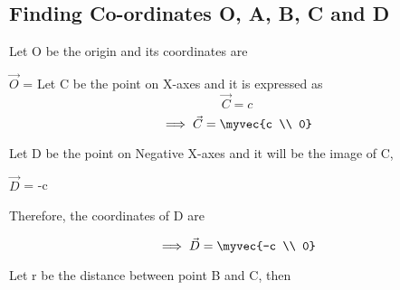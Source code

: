 \documentclass[journal,10pt,twocolumn]{article}
\begin{document}
\subsection{Finding Co-ordinates O, A, B, C and D}
\begin{flushleft}
Let O be the origin and its coordinates are\\
\vspace{0.25cm}

\center
\vspace{0.4cm}
$\vec{O}$ = 
\endcenter{}
\vspace{0.25cm}
Let C be the point on X-axes and it is expressed as\\
\vspace{0.25cm}
\begin{equation}
    \vec{C} = c
    \end{equation}
\begin{equation}
\implies \vec{C}= \myvec{c \\ 0}
\end{equation}

\vspace{0.25cm}
\begin{flushleft}
Let D be the point on Negative X-axes and it will be the image of C,\\
\begin{center}
$\vec{D}$  = -c\\
\end{center}
\vspace{0.2cm}
Therefore, the coordinates of D are\\
\end{flushleft}

\begin{equation}
\implies \vec{D}= \myvec{-c \\ 0}
\end{equation}

\vspace{0.25cm}
\begin{flushleft}
Let r be the distance between point B and C, then\\
\end{flushleft}


\end{flushleft}
\end{document}
